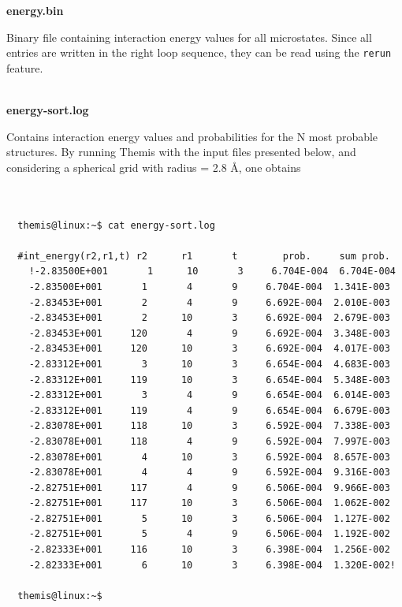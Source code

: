 \documentclass[10pt,a4paper]{report}
\begin{document}
\textbf{energy.bin}

  Binary file containing interaction energy values for all microstates. Since
  all entries are written in the right loop sequence, they can be read using the
  \texttt{rerun} feature. \\~

\textbf{energy-sort.log}
  
  Contains interaction energy values and probabilities for the N most probable
  structures. By running Themis with the input files presented below, and
  considering a spherical grid with radius = 2.8 \AA, one obtains \\~

\begin{center}
  \begin{minipage}{0.75\textwidth}
    \vskip0.25cm
    \begin{verbatim}

  themis@linux:~$ cat energy-sort.log

  #int_energy(r2,r1,t) r2      r1       t        prob.     sum prob.
    !-2.83500E+001       1      10       3     6.704E-004  6.704E-004
    -2.83500E+001       1       4       9     6.704E-004  1.341E-003
    -2.83453E+001       2       4       9     6.692E-004  2.010E-003
    -2.83453E+001       2      10       3     6.692E-004  2.679E-003
    -2.83453E+001     120       4       9     6.692E-004  3.348E-003
    -2.83453E+001     120      10       3     6.692E-004  4.017E-003
    -2.83312E+001       3      10       3     6.654E-004  4.683E-003
    -2.83312E+001     119      10       3     6.654E-004  5.348E-003
    -2.83312E+001       3       4       9     6.654E-004  6.014E-003
    -2.83312E+001     119       4       9     6.654E-004  6.679E-003
    -2.83078E+001     118      10       3     6.592E-004  7.338E-003
    -2.83078E+001     118       4       9     6.592E-004  7.997E-003
    -2.83078E+001       4      10       3     6.592E-004  8.657E-003
    -2.83078E+001       4       4       9     6.592E-004  9.316E-003
    -2.82751E+001     117       4       9     6.506E-004  9.966E-003
    -2.82751E+001     117      10       3     6.506E-004  1.062E-002
    -2.82751E+001       5      10       3     6.506E-004  1.127E-002
    -2.82751E+001       5       4       9     6.506E-004  1.192E-002
    -2.82333E+001     116      10       3     6.398E-004  1.256E-002
    -2.82333E+001       6      10       3     6.398E-004  1.320E-002!

  themis@linux:~$ 

    \end{verbatim}
  \end{minipage}%
\end{center}
\end{document}
